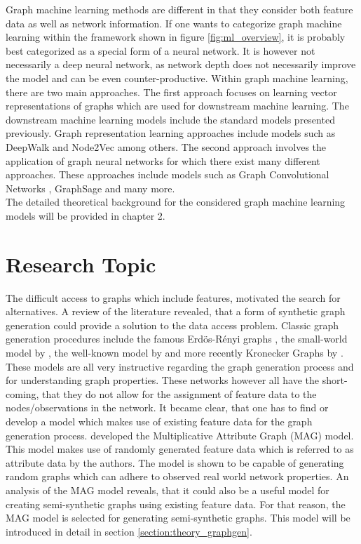 	\noindent Graph machine learning methods are different in that they consider 
	both feature data as well as network information. If one wants to categorize 
	graph machine learning within the framework shown in figure 
	\ref{fig:ml_overview}, it is probably best categorized as a special form of 
	a neural network. It is however not necessarily a deep neural network, as 
	network depth does not necessarily improve the model and can be even 
	counter-productive. Within graph machine learning, there are two main
	approaches. The first approach focuses on learning vector representations
	of graphs which are used for downstream machine learning. The downstream
	machine learning models include the standard models presented previously. 
	Graph representation learning approaches include models such as DeepWalk 
	\citep{perozzi2014deepwalk} and Node2Vec \citep{grover2016node2vec} among 
	others. The second approach involves the application of graph neural 
	networks for which there exist many different approaches. These approaches 
	include models such as Graph Convolutional Networks \citep{kipf2016semi}, 
	GraphSage \citep{hamilton2017inductive} and many more. \\

	\noindent The detailed theoretical background for the considered graph
	machine learning models will be provided in chapter 2.

	\section{Research Topic}
	\label{section:research_topics}

	\noindent The difficult access to graphs which include features, motivated 
	the search for alternatives. A review of the literature revealed, that a 
	form of synthetic graph generation could provide a solution to the data 
	access problem. Classic graph generation procedures include the famous 
	Erdös-Rényi graphs \citeyearpar{erdos1959random}, the small-world model by 
	\cite{watts1998collective}, the well-known model by 
	\cite{barabasi1999emergence} and more recently Kronecker Graphs by
	\cite{leskovec2010kronecker}. These models are all very instructive
	regarding the graph generation process and for understanding graph
	properties. These networks however all have the short-coming, that they do 
	not allow for the assignment of feature data to the nodes/observations in the
	network. It became clear, that one has to find or develop a model which 
	makes use of existing feature data for the graph generation process. 
	\cite{kim2012multiplicative} developed the Multiplicative Attribute 
	Graph (MAG) model. This model makes use of randomly generated feature data 
	which is referred to as attribute data by the authors. The model is shown
	to be capable of generating random graphs which can adhere to observed real 
	world network properties. An analysis of the MAG model reveals, that it 
	could also be a useful model for creating semi-synthetic graphs using 
	existing feature data. For that reason, the MAG model is selected for 
	generating semi-synthetic graphs. This model will be introduced in detail 
	in section \ref{section:theory_graphgen}. \\

